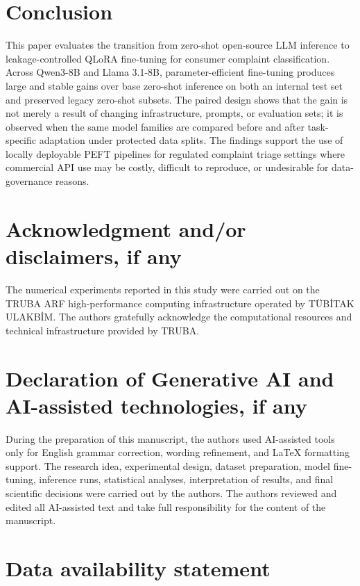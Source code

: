 \documentclass{elektr}
\begin{document}
\section{Conclusion}

This paper evaluates the transition from zero-shot open-source LLM inference to leakage-controlled QLoRA fine-tuning for consumer complaint classification. Across Qwen3-8B and Llama 3.1-8B, parameter-efficient fine-tuning produces large and stable gains over base zero-shot inference on both an internal test set and preserved legacy zero-shot subsets. The paired design shows that the gain is not merely a result of changing infrastructure, prompts, or evaluation sets; it is observed when the same model families are compared before and after task-specific adaptation under protected data splits. The findings support the use of locally deployable PEFT pipelines for regulated complaint triage settings where commercial API use may be costly, difficult to reproduce, or undesirable for data-governance reasons.

\section*{Acknowledgment and/or disclaimers, if any}

The numerical experiments reported in this study were carried out on the TRUBA ARF high-performance computing infrastructure operated by TÜBİTAK ULAKBİM. The authors gratefully acknowledge the computational resources and technical infrastructure provided by TRUBA.

\section*{Declaration of Generative AI and AI-assisted technologies, if any}

During the preparation of this manuscript, the authors used AI-assisted tools only for English grammar correction, wording refinement, and LaTeX formatting support. The research idea, experimental design, dataset preparation, model fine-tuning, inference runs, statistical analyses, interpretation of results, and final scientific decisions were carried out by the authors. The authors reviewed and edited all AI-assisted text and take full responsibility for the content of the manuscript.

\section*{Data availability statement}
\end{document}
